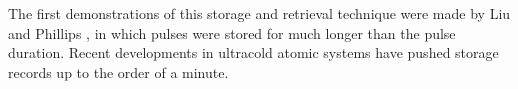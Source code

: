   The first demonstrations of this storage and retrieval technique were made by
  Liu \etal \cite{Liu2001} and Phillips \etal\cite{Phillips2001}, in which
  pulses were stored for much longer than the pulse duration. Recent
  developments in ultracold atomic systems have pushed storage records up to the
  order of a minute.\cite{Dudin2013}


